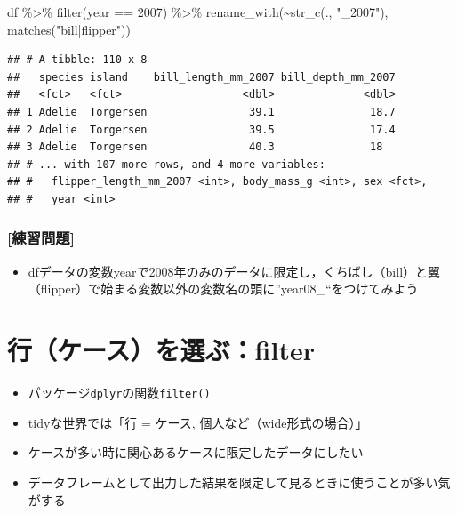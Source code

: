 \documentclass[
  xelatex,ja=standard, b5paper]{bxjsbook}
\newenvironment{Shaded}{\begin{snugshade}}{\end{snugshade}}
\newcommand{\DecValTok}[1]{\textcolor[rgb]{0.00,0.00,0.81}{#1}}
\newcommand{\FunctionTok}[1]{\textcolor[rgb]{0.00,0.00,0.00}{#1}}
\newcommand{\NormalTok}[1]{#1}
\newcommand{\SpecialCharTok}[1]{\textcolor[rgb]{0.00,0.00,0.00}{#1}}
\newcommand{\StringTok}[1]{\textcolor[rgb]{0.31,0.60,0.02}{#1}}
\providecommand{\tightlist}{%
  \setlength{\itemsep}{0pt}\setlength{\parskip}{0pt}}
\begin{document}
\begin{Shaded}
\begin{Highlighting}[]
\NormalTok{df }\SpecialCharTok{\%\textgreater{}\%} 
\FunctionTok{filter}\NormalTok{(year }\SpecialCharTok{==} \DecValTok{2007}\NormalTok{) }\SpecialCharTok{\%\textgreater{}\%} 
  \FunctionTok{rename\_with}\NormalTok{(}\SpecialCharTok{\textasciitilde{}}\FunctionTok{str\_c}\NormalTok{(., }\StringTok{"\_2007"}\NormalTok{),}
               \FunctionTok{matches}\NormalTok{(}\StringTok{"bill|flipper"}\NormalTok{))}
\end{Highlighting}
\end{Shaded}

\begin{verbatim}
## # A tibble: 110 x 8
##   species island    bill_length_mm_2007 bill_depth_mm_2007
##   <fct>   <fct>                   <dbl>              <dbl>
## 1 Adelie  Torgersen                39.1               18.7
## 2 Adelie  Torgersen                39.5               17.4
## 3 Adelie  Torgersen                40.3               18  
## # ... with 107 more rows, and 4 more variables:
## #   flipper_length_mm_2007 <int>, body_mass_g <int>, sex <fct>,
## #   year <int>
\end{verbatim}

\hypertarget{ux7df4ux7fd2ux554fux984c-5}{%
\subsection{{[}練習問題{]}}\label{ux7df4ux7fd2ux554fux984c-5}}

\begin{itemize}
\tightlist
\item
  dfデータの変数yearで2008年のみのデータに限定し，くちばし（bill）と翼（flipper）で始まる変数以外の変数名の頭に''year08\_``をつけてみよう
\end{itemize}

\hypertarget{filter}{%
\chapter{行（ケース）を選ぶ：filter}\label{filter}}

\begin{itemize}
\tightlist
\item
  パッケージ\texttt{dplyr}の関数\texttt{filter()}
\item
  tidyな世界では「行 = ケース, 個人など（wide形式の場合）」
\item
  ケースが多い時に関心あるケースに限定したデータにしたい
\item
  データフレームとして出力した結果を限定して見るときに使うことが多い気がする
\end{itemize}
\end{document}

